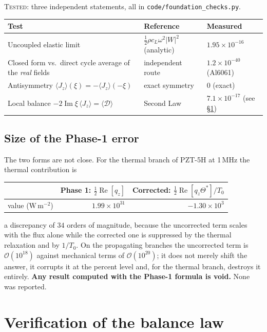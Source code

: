 \documentclass[11pt]{article}
\theoremstyle{plain}
\begin{document}
\textsc{Tested}: three independent statements, all in
\texttt{code/foundation\_checks.py}.

\begin{center}
\begin{tabular}{@{}lll@{}}
\toprule
Test & Reference & Measured \\
\midrule
Uncoupled elastic limit & $\tfrac12\rho c_L\omega^2\lvert W\rvert^2$ (analytic)
  & $1.95\times10^{-16}$ \\
Closed form vs.\ direct cycle average of the \emph{real} fields
  & independent route & $1.2\times10^{-40}$ (Al6061) \\
Antisymmetry $\langle J_z\rangle(\xi)=-\langle J_z\rangle(-\xi)$
  & exact symmetry & $0$ (exact) \\
Local balance $-2\operatorname{Im}\xi\,\langle J_z\rangle=\langle\mathcal{D}\rangle$
  & Second Law & $7.1\times10^{-17}$ (see \S\ref{sec:balance-verify}) \\
\bottomrule
\end{tabular}
\end{center}

\subsection{Size of the Phase-1 error}
\label{sec:error-size}

The two forms are not close. For the thermal branch of PZT-5H at 1\,MHz the
thermal contribution is
\begin{center}
\begin{tabular}{@{}lrr@{}}
\toprule
& Phase 1: $\tfrac12\operatorname{Re}[q_z]$ & Corrected: $\tfrac12\operatorname{Re}[q_z\Theta^*]/T_0$ \\
\midrule
value ($\mathrm{W\,m^{-2}}$) & $1.99\times10^{31}$ & $-1.30\times10^{3}$ \\
\bottomrule
\end{tabular}
\end{center}
a discrepancy of $34$ orders of magnitude, because the uncorrected term scales
with the flux alone while the corrected one is suppressed by the thermal
relaxation and by $1/T_0$. On the propagating branches the uncorrected term is
$\mathcal{O}(10^{18})$ against mechanical terms of $\mathcal{O}(10^{20})$; it does
not merely shift the answer, it corrupts it at the percent level and, for the
thermal branch, destroys it entirely. \textbf{Any result computed with the Phase-1
formula is void.} None was reported.

\section{Verification of the balance law}
\label{sec:balance-verify}
\end{document}

